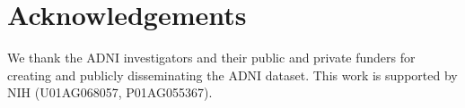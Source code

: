 \section{Acknowledgements}
We thank the ADNI investigators and their public and private funders for creating and publicly disseminating the ADNI dataset.
This work is supported by NIH (U01AG068057, P01AG055367).